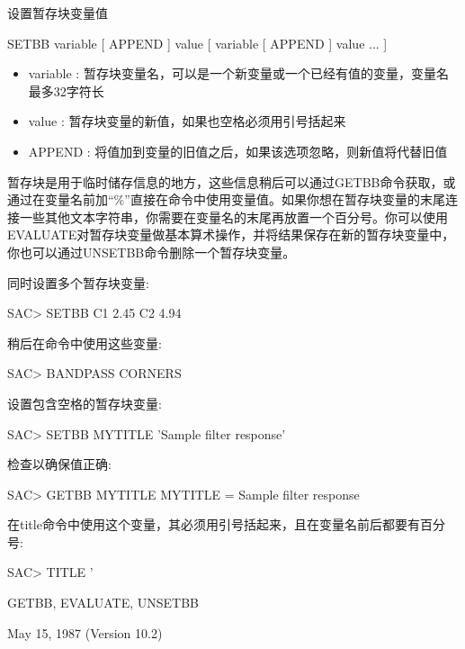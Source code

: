 \label{cmd:setbb}

设置暂存块变量值

SETBB variable  [ APPEND ] value [ variable [ APPEND ] value ... ]

\begin{itemize}
\item variable : 暂存块变量名，可以是一个新变量或一个已经有值的变量，变量名最多32字符长
\item value : 暂存块变量的新值，如果也空格必须用引号括起来 
\item APPEND : 将值加到变量的旧值之后，如果该选项忽略，则新值将代替旧值 
\end{itemize}

暂存块是用于临时储存信息的地方，这些信息稍后可以通过GETBB命令获取，或通过在变量名前加``\%''直接在命令中使用变量值。如果你想在暂存块变量的末尾连接一些其他文本字符串，你需要在变量名的末尾再放置一个百分号。你可以使用EVALUATE对暂存块变量做基本算术操作，并将结果保存在新的暂存块变量中，你也可以通过UNSETBB命令删除一个暂存块变量。

同时设置多个暂存块变量:
\begin{SACCode}
SAC>  SETBB C1 2.45 C2 4.94
\end{SACCode}

稍后在命令中使用这些变量:
\begin{SACCode}
SAC>  BANDPASS CORNERS %
\end{SACCode}

设置包含空格的暂存块变量:
\begin{SACCode}
SAC>  SETBB MYTITLE 'Sample filter response'
\end{SACCode}
检查以确保值正确:
\begin{SACCode}
SAC>  GETBB MYTITLE
 MYTITLE = Sample filter response
\end{SACCode}

在title命令中使用这个变量，其必须用引号括起来，且在变量名前后都要有百分号:
\begin{SACCode}
SAC>  TITLE '%
\end{SACCode}

GETBB, EVALUATE, UNSETBB

May 15, 1987 (Version 10.2)

